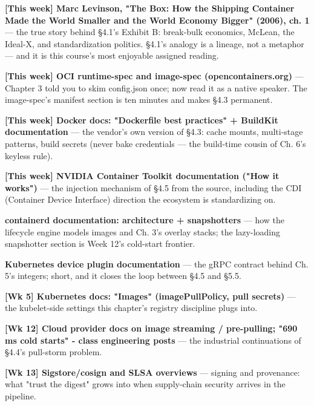 \begin{tbbitemize}
  \item \textbf{[This week] Marc Levinson, "The Box: How the Shipping Container Made the World Smaller and the World Economy Bigger" (2006), ch. 1} — the true story behind §4.1's Exhibit B: break-bulk economics, McLean, the Ideal-X, and standardization politics. §4.1's analogy is a lineage, not a metaphor — and it is this course's most enjoyable assigned reading.
  \item \textbf{[This week] OCI runtime-spec and image-spec (opencontainers.org)} — Chapter 3 told you to skim config.json once; now read it as a native speaker. The image-spec's manifest section is ten minutes and makes §4.3 permanent.
  \item \textbf{[This week] Docker docs: "Dockerfile best practices" + BuildKit documentation} — the vendor's own version of §4.3: cache mounts, multi-stage patterns, build secrets (never bake credentials — the build-time cousin of Ch. 6's keyless rule).
  \item \textbf{[This week] NVIDIA Container Toolkit documentation ("How it works")} — the injection mechanism of §4.5 from the source, including the CDI (Container Device Interface) direction the ecosystem is standardizing on.
  \item \textbf{containerd documentation: architecture + snapshotters} — how the lifecycle engine models images and Ch. 3's overlay stacks; the lazy-loading snapshotter section is Week 12's cold-start frontier.
  \item \textbf{Kubernetes device plugin documentation} — the gRPC contract behind Ch. 5's integers; short, and it closes the loop between §4.5 and §5.5.
  \item \textbf{[Wk 5] Kubernetes docs: "Images" (imagePullPolicy, pull secrets)} — the kubelet-side settings this chapter's registry discipline plugs into.
  \item \textbf{[Wk 12] Cloud provider docs on image streaming / pre-pulling; "690 ms cold starts" - class engineering posts} — the industrial continuations of §4.4's pull-storm problem.
  \item \textbf{[Wk 13] Sigstore/cosign and SLSA overviews} — signing and provenance: what "trust the digest" grows into when supply-chain security arrives in the pipeline.
\end{tbbitemize}

\vspace{5.0pt}


